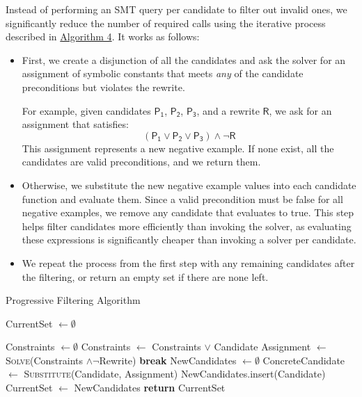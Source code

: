 \documentclass[review, anonymous, acmsmall]{acmart}
\newcommand{\blockmath}[1]{\[\mathsf{#1}\]}
\newcommand{\inline}[1]{$\mathsf{#1}$}
\begin{document}
Instead of performing an SMT query per candidate to filter out invalid ones, we significantly reduce the number of required calls using the iterative process described in \hyperref[alg:progressive]{Algorithm 4}. It works as follows:
\begin{itemize}
    \item First, we create a disjunction of all the candidates and ask the solver for an assignment of symbolic constants that meets \textit{any} of the candidate preconditions but violates the rewrite. 
    
    For example, given candidates \inline{P_1}, \inline{P_2}, \inline{P_3}, and a rewrite \inline{R}, we ask for an assignment that satisfies:
    \blockmath{(P_1 \lor P_2 \lor P_3) \land \neg R}
    This assignment represents a new negative example. If none exist, all the candidates are valid preconditions, and we return them.  
    \item Otherwise, we substitute the new negative example values into each candidate function and evaluate them. Since a valid precondition must be false for all negative examples, we remove any candidate that evaluates to true. This step helps filter candidates more efficiently than invoking the solver, as evaluating these expressions is significantly cheaper than invoking a solver per candidate. 
    \item We repeat the process from the first step with any remaining candidates after the filtering, or return an empty set if there are none left.  
\end{itemize}


\begin{algorithm}[tbh]
\caption{Progressive Filtering Algorithm}\label{alg:progressive}
\begin{algorithmic}[1]
\State CurrentSet $\gets \emptyset$

\State Constraints $\gets \emptyset$ 
\State Constraints  $\gets $ Constraints $\lor$ Candidate
\EndFor
\State Assignment $\gets$ \textsc{Solve}(Constraints $ \land \neg$Rewrite)
\State \textbf{break}
\EndIf
\State NewCandidates $\gets \emptyset$
  
\State ConcreteCandidate $\gets$ \textsc{Substitute}(Candidate, Assignment)
\State NewCandidates.insert(Candidate) 
\EndIf
\EndFor
\State CurrentSet $\gets $ NewCandidates
\EndWhile
\State \textbf{return} CurrentSet
\EndProcedure
\end{algorithmic}
\end{algorithm}
\end{document}
